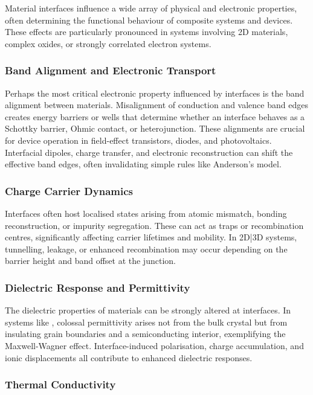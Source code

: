 Material interfaces influence a wide array of physical and electronic properties, often determining the functional behaviour of composite systems and devices. These effects are particularly pronounced in systems involving 2D materials, complex oxides, or strongly correlated electron systems.

\subsubsection{Band Alignment and Electronic Transport}

Perhaps the most critical electronic property influenced by interfaces is the band alignment between materials. Misalignment of conduction and valence band edges creates energy barriers or wells that determine whether an interface behaves as a Schottky barrier, Ohmic contact, or heterojunction. These alignments are crucial for device operation in field-effect transistors, diodes, and photovoltaics. Interfacial dipoles, charge transfer, and electronic reconstruction can shift the effective band edges, often invalidating simple rules like Anderson's model.

\subsubsection{Charge Carrier Dynamics}

Interfaces often host localised states arising from atomic mismatch, bonding reconstruction, or impurity segregation. These can act as traps or recombination centres, significantly affecting carrier lifetimes and mobility. In 2D|3D systems, tunnelling, leakage, or enhanced recombination may occur depending on the barrier height and band offset at the junction.

\subsubsection{Dielectric Response and Permittivity}

The dielectric properties of materials can be strongly altered at interfaces. In systems like , colossal permittivity arises not from the bulk crystal but from insulating grain boundaries and a semiconducting interior, exemplifying the Maxwell-Wagner effect. Interface-induced polarisation, charge accumulation, and ionic displacements all contribute to enhanced dielectric responses.

\subsubsection{Thermal Conductivity}

